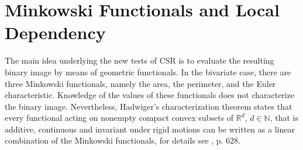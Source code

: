 \documentclass[12pt]{article}
\def\R{\mathbb{R}}
\def\N{\mathbb{N}}
\begin{document}
\section{Minkowski Functionals and Local Dependency}\label{sec:Minkowski.localdependency}
The main idea underlying the new tests of CSR is to evaluate the resulting binary image by means of geometric functionals. In the bivariate case, there are three Minkowski functionals, namely the area, the perimeter, and the Euler characteristic. Knowledge of the values of these functionals does not characterize the binary image.
Nevertheless, Hadwiger's characterization theorem states that every functional acting on nonempty compact convex subsets of $\R^d$, $d\in\N$, that is additive, continuous and invariant under rigid motions can be written as a linear combination of the Minkowski functionals, for details see \cite{19}, p. 628.
\end{document}
